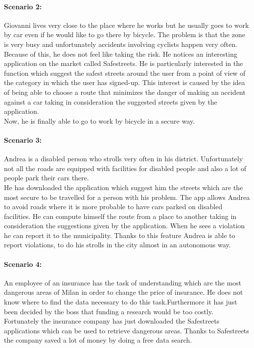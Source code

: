 \documentclass[titlepage]{article}
\begin{document}
\paragraph{Scenario 2:}Giovanni lives very close to the place where he works but he usually goes to work by car even if he would like to go there by bicycle. The problem is that the zone is very busy and unfortunately accidents involving cyclists happen very often. Because of this, he does not feel like taking the risk.
He notices an interesting application on the market called Safestreets. He is particularly interested in the function which suggest the safest streets around the user from a point of view of the category in which the user has signed-up. This interest is caused by the idea of ​​being able to choose a route that minimizes the danger of making an accident against a car taking in consideration the suggested streets given by the application.\\
Now, he is finally able to go to work by bicycle in a secure way.
\paragraph{Scenario 3:}Andrea is a disabled person who strolls very often in his district. Unfortunately not all the roads are equipped with facilities for disabled people and also a lot of people park their cars there.\\
He has downloaded the application which suggest him the streets which are the most secure to be travelled for a person with his problem. The app allows Andrea to avoid roads where it is more probable to have cars parked on disabled facilities. He can compute himself the route from a place to another taking in consideration the suggestions given by the application. When he sees a violation he can report it to the municipality. Thanks to this feature Andrea is able to report violations, to do his strolls in the city almost in an autonomous way.
\paragraph{Scenario 4:} An employee of an insurance has the task of understanding which are the most dangerous areas of Milan in order to change the price of insurance. He does not know where to find the data necessary to do this task.Furthermore it has just been decided by the boss that funding a research would be too costly.\\
Fortunately the insurance company has just downloaded the Safestreets applications which can be used to retrieve dangerous areas. Thanks to Safestreets the company saved a lot of money by doing a free data search.
\end{document}
